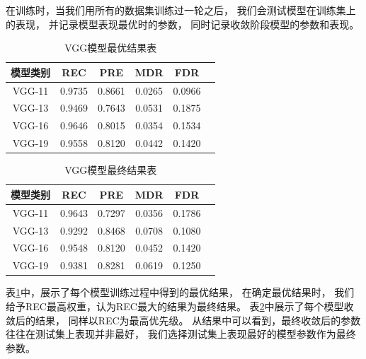 在训练时，当我们用所有的数据集训练过一轮之后，
我们会测试模型在训练集上的表现，
并记录模型表现最优时的参数，
同时记录收敛阶段模型的参数和表现。
\begin{table}[htbp]
\centering
\begin{tabular}{cccccp{38mm}}
\toprule
\textbf{模型类别} & \textbf{REC} & \textbf{PRE} & \textbf{MDR} & \textbf{FDR}\\
\midrule
\mbox{VGG-11} & 0.9735 & 0.8661 & 0.0265 & 0.0966\\
\mbox{VGG-13} & 0.9469 & 0.7643 & 0.0531 & 0.1875\\
\mbox{VGG-16} & 0.9646 & 0.8015 & 0.0354 & 0.1534\\
\mbox{VGG-19} & 0.9558 & 0.8120 & 0.0442 & 0.1420\\
\bottomrule
\end{tabular}
\caption{VGG模型最优结果表}
\label{tab:zuiyoujieguo}
\end{table}
\begin{table}[htbp]
\centering
\begin{tabular}{cccccp{38mm}}
\toprule
\textbf{模型类别} & \textbf{REC} & \textbf{PRE} & \textbf{MDR} & \textbf{FDR}\\
\midrule
\mbox{VGG-11} & 0.9643 & 0.7297 & 0.0356 & 0.1786\\
\mbox{VGG-13} & 0.9292 & 0.8468 & 0.0708 & 0.1080\\
\mbox{VGG-16} & 0.9548 & 0.8120 & 0.0452 & 0.1420\\
\mbox{VGG-19} & 0.9381 & 0.8281 & 0.0619 & 0.1250\\
\bottomrule
\end{tabular}
\caption{VGG模型最终结果表}
\label{tab:zuizhongjieguo}
\end{table}
表\ref{tab:zuiyoujieguo}中，展示了每个模型训练过程中得到的最优结果，
在确定最优结果时，
我们给予REC最高权重，认为REC最大的结果为最终结果。
表\ref{tab:zuizhongjieguo}中展示了每个模型收敛后的结果，
同样以REC为最高优先级。
从结果中可以看到，最终收敛后的参数往往在测试集上表现并非最好，
我们选择测试集上表现最好的模型参数作为最终参数。


